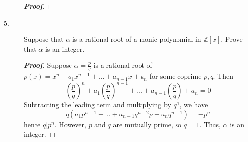 \documentclass[12pt,leqno]{book}
\theoremstyle{definition}
\newcommand{\Z}{\mathbb{Z}}
\newenvironment{Proof}{\begin{proof}[\textnormal{\textbf{Proof}}]}{\end{proof}}
\begin{document}
\begin{description}
\begin{Proof}
  \end{Proof}
 \item [5.] Suppose that $\alpha$ is a rational root of a monic polynomial in $\Z[x]$. Prove that $\alpha$ is an integer.
  \begin{Proof}
   Suppose $\alpha=\frac{p}{q}$ is a rational root of $p(x)=x^n+a_1x^{n-1}+\hdots+a_{n-1}x+a_n$ for some coprime $p,q$. Then \[\left(\frac{p}{q}\right)^n+a_1\left(\frac{p}{q}\right)^{n-1}+\hdots+a_{n-1}\left(\frac{p}{q}\right)+a_n=0\] Subtracting the leading term and multiplying by $q^n$, we have \[q\left(a_1p^{n-1}+\hdots+a_{n-1}q^{n-2}p+a_nq^{n-1}\right)=-p^n\] hence $q|p^n$. However, $p$ and $q$ are mutually prime, so $q=1$. Thus, $\alpha$ is an integer.
  \end{Proof}
\end{description}
\end{document}
